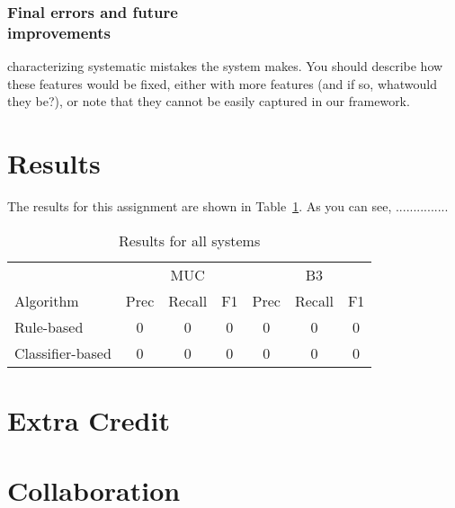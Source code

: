 \documentclass[12pt, twocolumn]{article}
\begin{document}
\subsubsection{Final errors and future\\ improvements}
characterizing systematic mistakes the system makes. You should describe how these features
would be fixed, either with more features (and if so, whatwould they be?), or note that they cannot be easily captured
in our framework.
\section{Results}
The results for this assignment are shown in Table~\ref{tab:results}. As you can see, ...............
\begin{table}[b]
\begin{minipage}{\textwidth}
\centering
\begin{tabular}{l|c c c|c c c}
\hline
& & MUC & & & B3 & \\
Algorithm & Prec & Recall & F1 & Prec & Recall & F1 \\\hline
Rule-based & 0 & 0 & 0 & 0 & 0 & 0\\\hline  
Classifier-based & 0 & 0 & 0 & 0 & 0 & 0\\\hline
\end{tabular}
\caption{Results for all systems}\label{tab:results}
\end{minipage}
\end{table}


\section{Extra Credit}

\section{Collaboration} 
\end{document}
